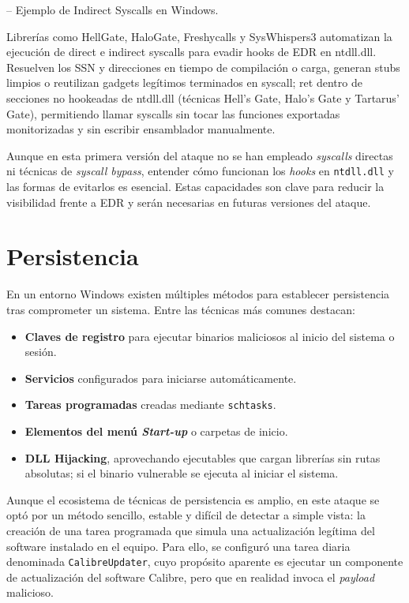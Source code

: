 \cite{ref:indirectsyscalls} – Ejemplo de Indirect Syscalls en Windows.

Librerías como HellGate, HaloGate, Freshycalls y SysWhispers3 automatizan la ejecución de direct e indirect syscalls para evadir hooks de EDR en ntdll.dll. Resuelven los SSN y direcciones en tiempo de compilación o carga, generan stubs limpios o reutilizan gadgets legítimos terminados en syscall; ret dentro de secciones no hookeadas de ntdll.dll (técnicas Hell’s Gate, Halo’s Gate y Tartarus’ Gate), permitiendo llamar syscalls sin tocar las funciones exportadas monitorizadas y sin escribir ensamblador manualmente.

Aunque en esta primera versión del ataque no se han empleado \textit{syscalls} directas ni técnicas de \textit{syscall bypass}, entender cómo funcionan los \textit{hooks} en \texttt{ntdll.dll} y las formas de evitarlos es esencial. Estas capacidades son clave para reducir la visibilidad frente a EDR y serán necesarias en futuras versiones del ataque.

\section{Persistencia}
\label{sec:persistencia}

En un entorno Windows existen múltiples métodos para establecer persistencia tras comprometer un sistema. 
Entre las técnicas más comunes destacan:

\begin{itemize}
    \item \textbf{Claves de registro} para ejecutar binarios maliciosos al inicio del sistema o sesión.
    \item \textbf{Servicios} configurados para iniciarse automáticamente.
    \item \textbf{Tareas programadas} creadas mediante \texttt{schtasks}.
    \item \textbf{Elementos del menú \textit{Start-up}} o carpetas de inicio.
    \item \textbf{DLL Hijacking}, aprovechando ejecutables que cargan librerías sin rutas absolutas; si el binario vulnerable se ejecuta al iniciar el sistema.
\end{itemize}

Aunque el ecosistema de técnicas de persistencia es amplio, en este ataque se optó por un método sencillo, 
estable y difícil de detectar a simple vista: la creación de una tarea programada que simula una actualización 
legítima del software instalado en el equipo. Para ello, se configuró una tarea diaria denominada 
\texttt{CalibreUpdater}, cuyo propósito aparente es ejecutar un componente de actualización del software 
Calibre, pero que en realidad invoca el \textit{payload} malicioso.

